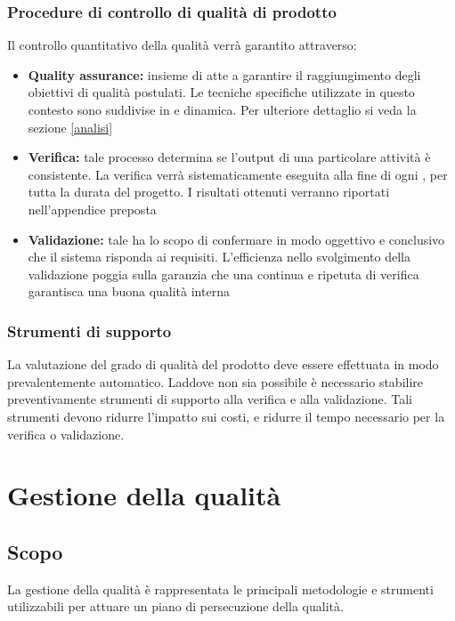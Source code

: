 \documentclass[12pt,a4paper]{article}
\begin{document}
\subsubsection{Procedure di controllo di qualità di prodotto}
\label{sec:procedure-di-controllo-di-qualità-di-prodotto}
Il controllo quantitativo della qualità verrà garantito attraverso:
\begin{itemize}
	\item \textbf{Quality assurance:} insieme di   atte a garantire il raggiungimento degli obiettivi di qualità postulati. 
	Le tecniche specifiche utilizzate in questo contesto sono suddivise in   e dinamica. Per ulteriore dettaglio si veda la sezione \ref{analisi}
	\item \textbf{Verifica:} tale processo determina se l'output di una particolare attività è consistente. La verifica verrà sistematicamente eseguita alla fine di ogni , per tutta la durata del progetto. I risultati ottenuti verranno riportati nell'appendice preposta
	\item \textbf{Validazione:} tale   ha lo scopo di confermare in modo oggettivo e conclusivo che il sistema risponda ai requisiti. L'efficienza nello svolgimento della validazione poggia sulla garanzia che una continua e ripetuta  di verifica garantisca una buona qualità interna
\end{itemize}
\subsubsection{Strumenti di supporto}
La valutazione del grado di qualità del prodotto deve essere effettuata in modo prevalentemente automatico. Laddove non sia possibile è necessario stabilire preventivamente strumenti di supporto alla verifica e alla validazione. Tali strumenti devono ridurre l'impatto sui costi, e ridurre il tempo necessario per la verifica o validazione. 

\section{Gestione della qualità} \label{gest_qual}
\subsection{Scopo}
La gestione della qualità è rappresentata le principali metodologie e strumenti utilizzabili per attuare un piano di persecuzione della qualità. 
\end{document}
